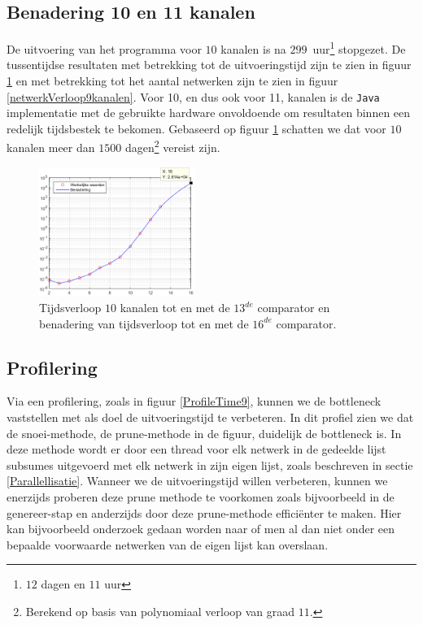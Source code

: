 \documentclass{article}
\begin{document}
\subsection{Benadering 10 en 11 kanalen}
De uitvoering van het programma voor $10$ kanalen is na $299$~uur\footnote{$12$ dagen en $11$ uur} stopgezet. %
De tussentijdse resultaten met betrekking tot de uitvoeringstijd zijn te zien in figuur \ref{tijdverloop10kanalen} en met betrekking tot het aantal netwerken zijn te zien in figuur \ref{netwerkVerloop9kanalen}.
Voor 10, en dus ook voor 11, kanalen is de \texttt{Java} implementatie met de gebruikte hardware onvoldoende om resultaten binnen een redelijk tijdsbestek te bekomen.
Gebaseerd op figuur \ref{tijdverloop10kanalen} schatten we dat voor $10$ kanalen meer dan $1500$ dagen\footnote{Berekend op basis van polynomiaal verloop van graad $11$.} vereist zijn. 
\begin{figure}
\centering
\includegraphics[width = 0.45\textwidth]{Benadering10_paper.png}
\caption{Tijdsverloop $10$ kanalen tot en met de  $13^{de}$ comparator en benadering van tijdsverloop tot en met de $16^{de}$ comparator.}
\label{tijdverloop10kanalen}
\end{figure}

\subsection{Profilering}
Via een profilering, zoals in figuur \ref{ProfileTime9}, kunnen we de bottleneck vaststellen met als doel de uitvoeringstijd te verbeteren.
In dit profiel zien we dat de snoei-methode, de prune-methode in de figuur, duidelijk de bottleneck is.
In deze methode wordt er door een thread voor elk netwerk in de gedeelde lijst subsumes uitgevoerd met elk netwerk in zijn eigen lijst, zoals beschreven in sectie \ref{Parallellisatie}.
Wanneer we de uitvoeringstijd willen verbeteren, kunnen we enerzijds proberen deze prune methode te voorkomen zoals bijvoorbeeld in de genereer-stap en anderzijds door deze prune-methode effici\"enter te maken.
Hier kan bijvoorbeeld onderzoek gedaan worden naar of men al dan niet onder een bepaalde voorwaarde netwerken van de eigen lijst kan overslaan.
\end{document}
